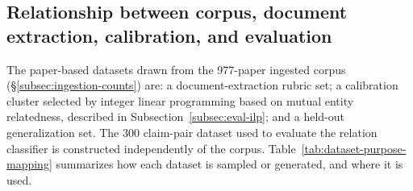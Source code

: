 \subsection{Relationship between corpus, document extraction, calibration, and evaluation}\label{subsec:relationship-of-corpus-with-datasets}

The paper-based datasets drawn from the 977-paper ingested corpus (§\ref{subsec:ingestion-counts}) are: a document-extraction rubric set; a calibration cluster selected by integer linear programming based on mutual entity relatedness, described in Subsection~\ref{subsec:eval-ilp}; and a held-out generalization set. The 300 claim-pair dataset used to evaluate the relation classifier is constructed independently of the corpus. Table~\ref{tab:dataset-purpose-mapping} summarizes how each dataset is sampled or generated, and where it is used. 

